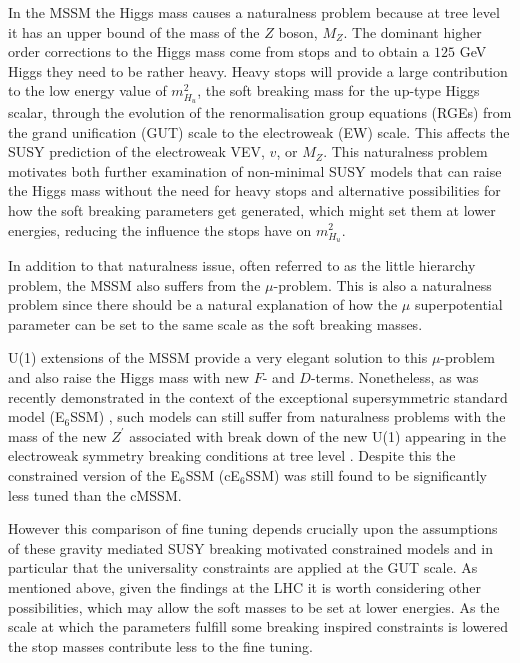 \documentclass[preprint,amsmath,amssymb,aps,superscriptaddress,prd,showpacs,floatfix,nofootinbib]{revtex4-1}
\begin{document}
In the MSSM the Higgs mass causes a naturalness problem because at
tree level it has an upper bound of the mass of the $Z$ boson,
$M_Z$. The dominant higher order corrections to the Higgs mass come
from stops and to obtain a $125$ GeV Higgs they need to be rather
heavy. Heavy stops will provide a large contribution to the low energy
value of $m_{H_u}^2$, the soft breaking mass for the up-type Higgs
scalar, through the evolution of the renormalisation group equations
(RGEs) from the grand unification (GUT) scale to the electroweak (EW)
scale. This affects the SUSY prediction of the electroweak VEV, $v$,
or $M_Z$.  This naturalness problem motivates both further examination
of non-minimal SUSY models that can raise the Higgs mass without the
need for heavy stops and alternative possibilities for how the soft
breaking parameters get generated, which might set them at lower
energies, reducing the influence the stops have on $m_{H_u}^2$.

In addition to that naturalness issue, often referred to as the little
hierarchy problem, the MSSM also suffers from the $\mu$-problem. This
is also a naturalness problem since there should be a natural explanation
of how the $\mu$ superpotential parameter can be set to the same scale
as the soft breaking masses.

U(1) extensions of the MSSM provide a very elegant solution to this
$\mu$-problem \cite{Fayet:1977yc, Kim:1983dt, Suematsu:1994qm,
  Cvetic:1995rj, Cvetic:1996mf, Jain:1995cb, Nir:1995bu,
  Cvetic:1997ky} and also raise the Higgs mass with new $F$- and
$D$-terms. Nonetheless, as was recently demonstrated in the context of
the exceptional supersymmetric standard model (E$_6$SSM)
\cite{King:2005jy,King:2005my,Athron:2010zz}, such models can still
suffer from naturalness problems with the mass of the new $Z^\prime$
associated with break down of the new U(1) appearing in the
electroweak symmetry breaking conditions at tree level
\cite{Athron:2013ipa}. Despite this the constrained version of
the E$_6$SSM (cE$_6$SSM) \cite{Athron:2009ue, Athron:2009bs} was still found
to be significantly less tuned than the cMSSM.

However this comparison of fine tuning depends crucially upon the
assumptions of these gravity mediated SUSY breaking motivated
constrained models and in particular that the universality
constraints are applied at the GUT scale.  As mentioned above, given
the findings at the LHC it is worth considering other possibilities,
which may allow the soft masses to be set at lower energies. As the
scale at which the parameters fulfill some breaking inspired
constraints is lowered the stop masses contribute less to the fine
tuning.
\end{document}
